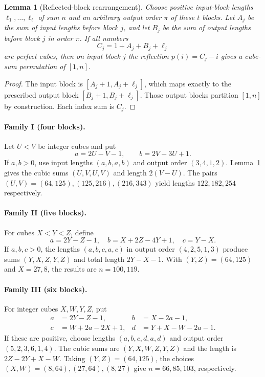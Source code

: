 \documentclass[10pt]{article}
\newtheorem{lemma}{Lemma}
\begin{document}
\begin{lemma}[Reflected-block rearrangement]\label{lem:main-block-rearrange}
Choose positive input-block lengths
$\ell_1,\ldots,\ell_t$ of sum $n$ and an arbitrary
output order $\pi$ of these $t$ blocks.
Let $A_j$ be the sum of input lengths before
block $j$, and let $B_j$ be the sum of output
lengths before block $j$ in order $\pi$.
If all numbers
\[
  C_j=1+A_j+B_j+\ell_j
\]
are perfect cubes, then on input block $j$
the reflection $p(i)=C_j-i$ gives a cube-sum
permutation of $[1,n]$.
\end{lemma}
\begin{proof}
The input block is $[A_j+1,A_j+\ell_j]$,
which maps exactly to the prescribed output
block $[B_j+1,B_j+\ell_j]$.
Those output blocks partition $[1,n]$
by construction. Each index sum is $C_j$.
\end{proof}

\paragraph{Family I (four blocks).}
Let $U<V$ be integer cubes and put
\[
a=2U-V-1,\qquad b=2V-3U+1.
\]
If $a,b>0$, use input lengths $(a,b,a,b)$
and output order $(3,4,1,2)$.
Lemma~\ref{lem:main-block-rearrange} gives the cubic
sums $(U,V,U,V)$ and length $2(V-U)$.
The pairs $(U,V)=(64,125),(125,216),(216,343)$
yield lengths $122,182,254$ respectively.

\paragraph{Family II (five blocks).}
For cubes $X<Y<Z$, define
\[
a=2Y-Z-1,\quad
b=X+2Z-4Y+1,\quad c=Y-X.
\]
If $a,b,c>0$, the lengths $(a,b,c,a,c)$
in output order $(4,2,5,1,3)$ produce
sums $(Y,X,Z,Y,Z)$ and total length
$2Y-X-1$. With $(Y,Z)=(64,125)$ and
$X=27,8$, the results are $n=100,119$.

\paragraph{Family III (six blocks).}
For integer cubes $X,W,Y,Z$, put
\[
\begin{aligned}
a&=2Y-Z-1,& b&=X-2a-1,\\
c&=W+2a-2X+1,& d&=Y+X-W-2a-1.
\end{aligned}
\]
If these are positive, choose lengths
$(a,b,c,d,a,d)$ and output order
$(5,2,3,6,1,4)$. The cubic sums are
$(Y,X,W,Z,Y,Z)$ and the length is
$2Z-2Y+X-W$. Taking $(Y,Z)=(64,125)$,
the choices $(X,W)=(8,64),(27,64),(8,27)$
give $n=66,85,103$, respectively.
\end{document}
